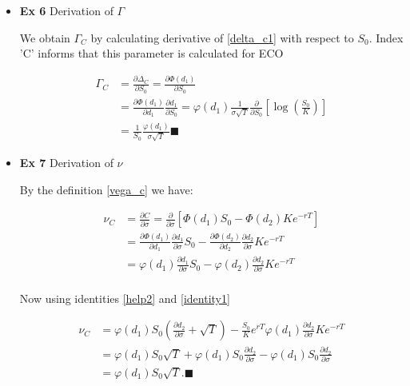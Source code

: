 \documentclass[12pt]{article}
\begin{document}
\begin{enumerate}[leftmargin=\labelsep]
\begin{itemize}
\item \textbf{Ex 6} Derivation of $\Gamma$

We obtain $\Gamma_C$ by calculating derivative of \eqref{delta_c1} with respect to $S_0$. Index 'C' informs that this parameter is calculated for ECO

\begin{equation}
\begin{split}\label{gamma}
        \Gamma_C &= \frac{\partial \Delta_C}{\partial S_0}
        = \frac{\partial \Phi(d_1)}{\partial S_0} \\
        &= \frac{\partial  \Phi(d_1)}{\partial d_1} 
        \frac{\partial  d_1}{\partial S_0} 
        = \varphi(d_1) \frac{1}{\sigma \sqrt{T}}\frac{\partial }{\partial S_0}  \left[ \log\left(\frac{S_0}{K}\right) \right] \\
        &= \frac{1}{S_0}\frac{\varphi(d_1)}{\sigma  \sqrt{T}} \blacksquare\end{split}
\end{equation}

\item \textbf{Ex 7} Derivation of $\nu$

By the definition \eqref{vega_c} we have:

\begin{equation}
\begin{split}\label{vega_c1}
        \nu_C &= \frac{\partial C}{\partial \sigma}
        = \frac{\partial }{\partial \sigma} 
        \left[ \Phi(d_1)S_0 - \Phi(d_2)Ke^{-rT} \right] \\
        &= \frac{\partial \Phi(d_1) }{\partial d_1} \frac{\partial d_1}{\partial \sigma} S_0
    - \frac{\partial \Phi(d_2) }{\partial d_2} \frac{\partial d_2}{\partial \sigma}
    Ke^{-rT}\\
        &= \varphi(d_1) \frac{\partial d_1}{\partial \sigma} S_0
    - \varphi(d_2) \frac{\partial d_2}{\partial \sigma}
    Ke^{-rT}\\
\end{split}
\end{equation}

Now using identities \eqref{help2} and \eqref{identity1}

\begin{equation}
\begin{split}\label{vega_c1}
    \nu_C &= \varphi(d_1) S_0 \left( \frac{\partial d_2}{\partial \sigma} + \sqrt{T} \right)
    - \frac{S_0}{K} e^{rT} \varphi(d_1) \frac{\partial d_2}{\partial \sigma}
    Ke^{-rT}\\
    &= \varphi(d_1) S_0 \sqrt{T} 
    + \varphi(d_1) S_0 \frac{\partial d_2}{\partial \sigma}
    - \varphi(d_1) S_0 \frac{\partial d_2}{\partial \sigma} \\
    &= \varphi(d_1) S_0 \sqrt{T}. \blacksquare
\end{split}
\end{equation}

\end{itemize}
\end{enumerate}

 

\end{document}
